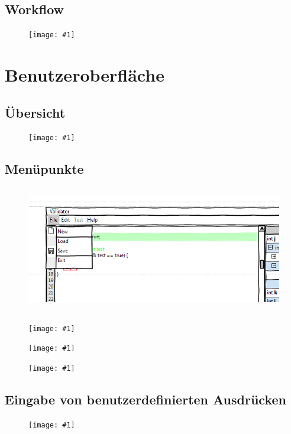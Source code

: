 \documentclass[a4paper,10pt]{article}
\newlength{\imgwidth}
\newcommand\scalegraphics[1]{
  \settowidth{\imgwidth}{\texttt{[image: \#1]}}
  \setlength{\imgwidth}{\minof{\imgwidth}{\textwidth}}
  \texttt{[image: \#1]}
}
\begin{document}
\newpage
\subsection{Workflow}
\begin{figure}[h!]
\begin{center}
\scalegraphics{images/process.png}
\end{center}
\end{figure}


\section{Benutzeroberfl\"{a}che}
\subsection{\"{U}bersicht}
\begin{figure}[h!]
\scalegraphics{images/mockupf.png}
\end{figure}

\subsection{Men\"{u}punkte}
\begin{figure}[h!]
\begin{center}
\includegraphics[height=5.5cm]{images/menu1.png}
\end{center}
\end{figure}
\begin{figure}[h!]
\scalegraphics{images/menu2.png}
\end{figure}
\begin{figure}[h!]
\scalegraphics{images/menu3.png}
\end{figure}
\begin{figure}[h!]
\scalegraphics{images/menu4.png}
\end{figure}
\clearpage
\subsection{Eingabe von benutzerdefinierten Ausdr\"{u}cken}
\begin{figure}[h!]
\scalegraphics{images/mockupf2.png}
\end{figure}
\end{document}

